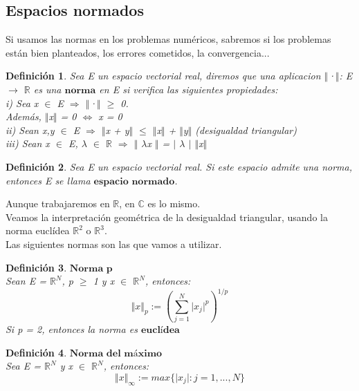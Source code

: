 \documentclass[10pt, a4paper]{article}
\theoremstyle{theorem-style}
\theoremstyle{definition-style}
\newtheorem{ndef}{Definición}[section]
\theoremstyle{remark-style}
\theoremstyle{example-style}
\theoremstyle{definition-style}
\theoremstyle{remark-style}
\begin{document}
\subsection{Espacios normados}
Si usamos las normas en los problemas numéricos, sabremos si los problemas están bien planteados, los errores cometidos, la convergencia...\\

\begin{ndef}
Sea E un espacio vectorial real, diremos que una aplicacion $\Vert$·$\Vert$: E $\rightarrow$ $\mathbb{R}$ es una $\textbf{norma}$ en E si verifica las siguientes propiedades:\\
i) Sea x $\in$ E $\Rightarrow$ $\Vert$·$\Vert$ $\geq$ 0.\\ 
Además, $\Vert$x$\Vert$ = 0 $\Leftrightarrow$ x = 0\\
ii) Sean x,y $\in$ E $\Rightarrow$ $\Vert$x + y$\Vert$ $\leq$ $\Vert$x$\Vert$ + $\Vert$y$\Vert$ (desigualdad triangular)\\
iii) Sean x $\in$ E, $\lambda$ $\in$ $\mathbb{R}$ $\Rightarrow$ $\Vert$ $\lambda$x $\Vert$ = $\vert$ $\lambda$ $\vert$ $\Vert$x$\Vert$\\
\end{ndef}

\begin{ndef}
Sea E un espacio vectorial real. Si este espacio admite una norma, entonces E se llama $\textbf{espacio normado}$.
\end{ndef}

Aunque trabajaremos en $\mathbb{R}$, en $\mathbb{C}$ es lo mismo.\\

Veamos la interpretación geométrica de la desigualdad triangular, usando la norma euclídea $\mathbb{R}^2$ o $\mathbb{R}^3$.\\

Las siguientes normas son las que vamos a utilizar.

\begin{ndef}
$\textbf{Norma p}$\\
Sean E = $\mathbb{R}^N$, p $\geq$ 1 y x $\in$ $\mathbb{R}^N$, entonces:
\[ \Vert x \Vert _{p} := \left( \sum_{j=1}^{N} \vert x_{j} \vert ^p \right) ^{1/p} \]
Si p = 2, entonces la norma es $\textbf{euclídea}$
\end{ndef}

\begin{ndef}
$\textbf{Norma del máximo}$\\
Sea E = $\mathbb{R}^N$ y x $\in$ $\mathbb{R}^N$, entonces:
\[ \Vert x \Vert _{\infty} := max \lbrace \vert x_{j} \vert : j = 1,...,N \rbrace \]
\end{ndef}
\end{document}
